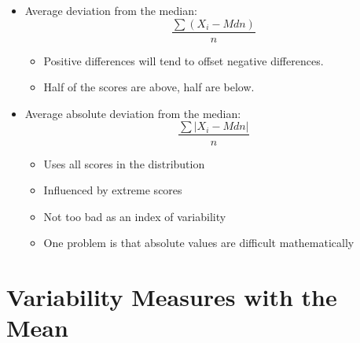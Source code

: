 \documentclass[12pt]{article}
\begin{document}
\begin{itemize}
\itemsep1pt\parskip0pt
\item
  Average deviation from the median: \[ \frac{\sum (X_{i} - Mdn)}{n} \]

  \begin{itemize}
  \itemsep1pt\parskip0pt
  \item
    Positive differences will tend to offset negative differences.
  \item
    Half of the scores are above, half are below.
  \end{itemize}
\item
  Average absolute deviation from the median:
  \[ \frac{\sum |X_{i} - Mdn|}{n} \]

  \begin{itemize}
  \itemsep1pt\parskip0pt
  \item
    Uses all scores in the distribution
  \item
    Influenced by extreme scores
  \item
    Not too bad as an index of variability
  \item
    One problem is that absolute values are difficult mathematically
  \end{itemize}
\end{itemize}

\section{Variability Measures with the
Mean}\label{variability-measures-with-the-mean}
\end{document}
